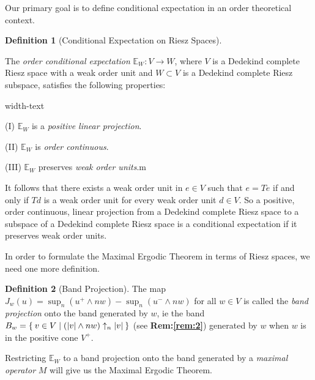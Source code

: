 \documentclass[letterpaper,10pt,oneside,onecolumn,reqno]{amsart}
\newcommand{\E}{\mathbb E}
\theoremstyle{definition}
\newtheorem{defn}{Definition}
\newcommand{\meet}{\wedge}
\begin{document}
Our primary goal is to define conditional expectation in an order
theoretical context.

\begin{defn}[Conditional Expectation on Riesz Spaces]\label{def:15}

  The \emph{order conditional
    expectation} $\E_W: V \to W$, where $V$ is a Dedekind
  complete Riesz space with a weak order unit and $W \subset V$ is a
  Dedekind complete Riesz subspace, satisfies the following
  properties:

  \begin{deflist}{width-text}
  \item[(I)] $\E_W$ is a \emph{positive linear projection}.
  \item[(II)] $\E_W$ is \emph{order continuous}.
  \item[(III)] $\E_W$ preserves \emph{weak order units}.m
  \end{deflist}
\end{defn}

\begin{framed}
  It follows that there exists a weak order unit in $e \in V$ such
  that $e = Te$ if and only if $Td$ is a weak order unit for every
  weak order unit $d \in V$. So a positive, order continuous, linear
  projection from a Dedekind complete Riesz space to a subspace of a
  Dedekind complete Riesz space is a conditional expectation if it
  preserves weak order units.
\end{framed}

In order to formulate the Maximal Ergodic Theorem in terms of Riesz
spaces, we need one more definition.

\begin{defn}[Band Projection]\label{def:16}
  The map $J_w(u) = \sup_n (u^+ \meet nw) - \sup_n(u^- \meet nw)$ for
  all $w \in V$ is called the \emph{band
    projection} onto the band generated by $w$, ie the band $B_w =
  \Set{v \in V | (|v| \meet nw) \uparrow_n |v|}$ (see
  \textbf{Rem:\ref{rem:2}}) generated by $w$ when $w$ is in the
  positive cone $V^+$.
\end{defn}

Restricting $\E_W$ to a band projection onto the band generated
by a \emph{maximal operator} $M$ will give us
the Maximal Ergodic Theorem.
\end{document}
